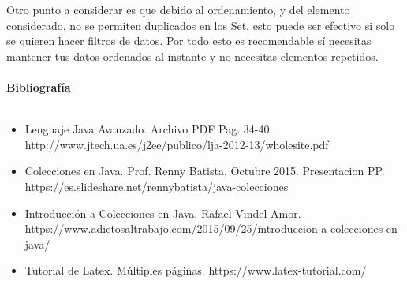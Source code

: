 \documentclass{article}
\begin{document}
Otro punto a considerar es que debido al ordenamiento, y del elemento considerado, no se permiten duplicados en los Set, esto puede ser efectivo si solo se quieren hacer filtros de datos.
Por todo esto es recomendable sí necesitas mantener tus datos ordenados al instante y no necesitas elementos repetidos.
	\\
	\\
	\Large \textbf{Bibliografía}
	\\
	\\
	\normalsize
	\begin{itemize}
		\item Lenguaje Java Avanzado. Archivo PDF Pag. 34-40. 
		\\	http://www.jtech.ua.es/j2ee/publico/lja-2012-13/wholesite.pdf
		\item Colecciones en Java. Prof. Renny Batista, Octubre 2015. Presentacion PP. 
		\\	https://es.slideshare.net/rennybatista/java-colecciones
		\item Introducción a Colecciones en Java. Rafael Vindel Amor. 
		\\	https://www.adictosaltrabajo.com/2015/09/25/introduccion-a-colecciones-en-java/
		\item Tutorial de Latex. Múltiples páginas. https://www.latex-tutorial.com/
	\end{itemize}
\end{document}
